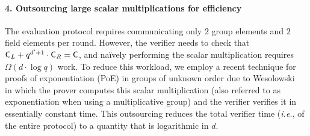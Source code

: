 \paragraph{4. Outsourcing large scalar multiplications for efficiency}
The evaluation protocol requires communicating only $2$ group elements and $2$ field elements per round. However, the verifier needs to check that $\gr{C}_L+{q^{d'+1}}\cdot \gr{C}_R=\gr{C}$, and naïvely performing the scalar multiplication requires $\Omega(d \cdot \log q)$ work. To reduce this workload, we employ a recent technique for proofs of exponentiation (\textsf{PoE}) in groups of unknown order due to Wesolowski~\cite{EC:Wesolowski19} in which the prover computes this scalar multiplication (also referred to as exponentiation when using a multiplicative group) and the verifier verifies it in essentially constant time. This outsourcing reduces the total verifier time (\emph{i.e.}, of the entire protocol) to a quantity that is logarithmic in $d$. %

